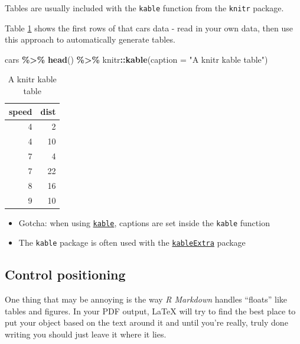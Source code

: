 \documentclass[a4paper, nobind]{templates/ociamthesis}
\providecommand{\tightlist}{%
  \setlength{\itemsep}{0pt}\setlength{\parskip}{0pt}}
\newenvironment{Shaded}{\begin{snugshade}}{\end{snugshade}}
\newcommand{\AttributeTok}[1]{\textcolor[rgb]{0.13,0.29,0.53}{#1}}
\newcommand{\FunctionTok}[1]{\textcolor[rgb]{0.13,0.29,0.53}{\textbf{#1}}}
\newcommand{\NormalTok}[1]{#1}
\newcommand{\SpecialCharTok}[1]{\textcolor[rgb]{0.81,0.36,0.00}{\textbf{#1}}}
\newcommand{\StringTok}[1]{\textcolor[rgb]{0.31,0.60,0.02}{#1}}
\renewenvironment{Shaded}
{
  \vspace{10pt}%
  \begin{snugshade}%
}{%
  \end{snugshade}%
  \vspace{8pt}%
}
\begin{document}
Tables are usually included with the \texttt{kable} function from the \texttt{knitr} package.

Table \ref{tab:cars-table} shows the first rows of that cars data - read in your own data, then use this approach to automatically generate tables.

\begin{Shaded}
\begin{Highlighting}[]
\NormalTok{cars }\SpecialCharTok{\%\textgreater{}\%} 
  \FunctionTok{head}\NormalTok{() }\SpecialCharTok{\%\textgreater{}\%} 
\NormalTok{  knitr}\SpecialCharTok{::}\FunctionTok{kable}\NormalTok{(}\AttributeTok{caption =} \StringTok{"A knitr kable table"}\NormalTok{)}
\end{Highlighting}
\end{Shaded}

\begin{table}

\caption{\label{tab:cars-table}A knitr kable table}
\centering
\begin{tabular}[t]{r|r}
\hline
speed & dist\\
\hline
4 & 2\\
\hline
4 & 10\\
\hline
7 & 4\\
\hline
7 & 22\\
\hline
8 & 16\\
\hline
9 & 10\\
\hline
\end{tabular}
\end{table}

\begin{itemize}
\tightlist
\item
  Gotcha: when using \href{https://www.rdocumentation.org/packages/knitr/versions/1.21/topics/kable}{\texttt{kable}}, captions are set inside the \texttt{kable} function
\item
  The \texttt{kable} package is often used with the \href{https://cran.r-project.org/web/packages/kableExtra/vignettes/awesome_table_in_html.html}{\texttt{kableExtra}} package
\end{itemize}

\subsection{Control positioning}\label{control-positioning}

One thing that may be annoying is the way \emph{R Markdown} handles ``floats'' like tables and figures.
In your PDF output, LaTeX will try to find the best place to put your object based on the text around it and until you're really, truly done writing you should just leave it where it lies.
\end{document}
